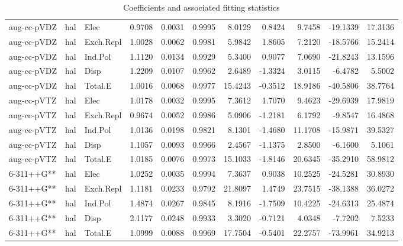 \begin{table}[ht]
\begin{tabular}{lllrrrrrrrr}
  aug-cc-pVDZ & hal & Elec & 0.9708 & 0.0031 & 0.9995 & 8.0129 & 0.8424 & 9.7458 & -19.1339 & 17.3136 \\ 
  aug-cc-pVDZ & hal & Exch.Repl & 1.0028 & 0.0062 & 0.9981 & 5.9842 & 1.8605 & 7.2120 & -18.5766 & 15.2414 \\ 
  aug-cc-pVDZ & hal & Ind.Pol & 1.1120 & 0.0134 & 0.9929 & 5.3400 & 0.9077 & 7.0690 & -21.8243 & 13.1596 \\ 
  aug-cc-pVDZ & hal & Disp & 1.2209 & 0.0107 & 0.9962 & 2.6489 & -1.3324 & 3.0115 & -6.4782 & 5.5002 \\ 
  aug-cc-pVDZ & hal & Total.E & 1.0016 & 0.0068 & 0.9977 & 15.4243 & -0.3512 & 18.9186 & -40.5806 & 38.7764 \\ 
  aug-cc-pVTZ & hal & Elec & 1.0178 & 0.0032 & 0.9995 & 7.3612 & 1.7070 & 9.4623 & -29.6939 & 17.9819 \\ 
  aug-cc-pVTZ & hal & Exch.Repl & 0.9674 & 0.0052 & 0.9986 & 5.0906 & -1.2181 & 6.1792 & -9.8547 & 16.4868 \\ 
  aug-cc-pVTZ & hal & Ind.Pol & 1.0136 & 0.0198 & 0.9821 & 8.1301 & -1.4680 & 11.1708 & -15.9871 & 39.5327 \\ 
  aug-cc-pVTZ & hal & Disp & 1.1057 & 0.0093 & 0.9966 & 2.4567 & -1.1375 & 2.8500 & -6.1600 & 5.1061 \\ 
  aug-cc-pVTZ & hal & Total.E & 1.0185 & 0.0076 & 0.9973 & 15.1033 & -1.8146 & 20.6345 & -35.2910 & 58.9812 \\ 
  6-311++G** & hal & Elec & 1.0252 & 0.0035 & 0.9994 & 7.3637 & 0.9038 & 10.2525 & -24.5281 & 30.8930 \\ 
  6-311++G** & hal & Exch.Repl & 1.1181 & 0.0233 & 0.9792 & 21.8097 & 1.4749 & 23.7515 & -38.1388 & 36.0272 \\ 
  6-311++G** & hal & Ind.Pol & 1.4874 & 0.0267 & 0.9845 & 8.1916 & -1.7509 & 10.4225 & -24.6313 & 25.4874 \\ 
  6-311++G** & hal & Disp & 2.1177 & 0.0248 & 0.9933 & 3.3020 & -0.7121 & 4.0348 & -7.7202 & 7.5233 \\ 
  6-311++G** & hal & Total.E & 1.0999 & 0.0088 & 0.9969 & 17.7504 & -0.5401 & 22.2757 & -73.9961 & 34.9213 \\ 
   \hline
\end{tabular}
    \caption{Coefficients and associated fitting statistics \label{tab:coef_indiv}}
\end{table}



